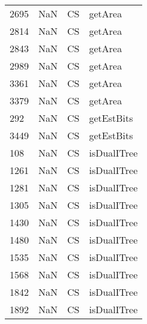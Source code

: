 \begin{tabular}{llll}
2695 &                   NaN &                         CS &                                   getArea \\
2814 &                   NaN &                         CS &                                   getArea \\
2843 &                   NaN &                         CS &                                   getArea \\
2989 &                   NaN &                         CS &                                   getArea \\
3361 &                   NaN &                         CS &                                   getArea \\
3379 &                   NaN &                         CS &                                   getArea \\
292  &                   NaN &                         CS &                                getEstBits \\
3449 &                   NaN &                         CS &                                getEstBits \\
108  &                   NaN &                         CS &                               isDualITree \\
1261 &                   NaN &                         CS &                               isDualITree \\
1281 &                   NaN &                         CS &                               isDualITree \\
1305 &                   NaN &                         CS &                               isDualITree \\
1430 &                   NaN &                         CS &                               isDualITree \\
1480 &                   NaN &                         CS &                               isDualITree \\
1535 &                   NaN &                         CS &                               isDualITree \\
1568 &                   NaN &                         CS &                               isDualITree \\
1842 &                   NaN &                         CS &                               isDualITree \\
1892 &                   NaN &                         CS &                               isDualITree \\

\end{tabular}
